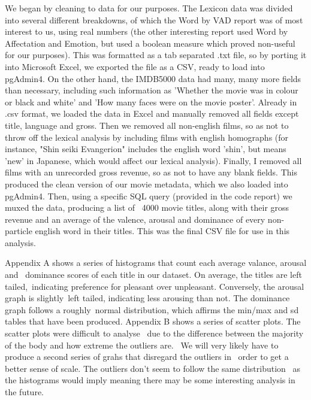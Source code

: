 \documentclass[10pt,a4paper]{article}
\begin{document}
    We began by cleaning to data for our purposes. The Lexicon data was divided into several different breakdowns, of which the Word by VAD report was of most interest to us, using real numbers (the other interesting report used Word by Affectation and Emotion, but used a boolean measure which proved non-useful for our purposes). This was formatted as a tab separated .txt file, so by porting it into Microsoft Excel, we exported the file as a CSV, ready to load into pgAdmin4.
    \newline \newline
    On the other hand, the IMDB5000 data had many, many more fields than necessary, including such information as 'Whether the movie was in colour or black and white' and 'How many faces were on the movie poster'. Already in .csv format, we loaded the data in Excel and manually removed all fields except title, language and gross. Then we removed all non-english films, so as not to throw off the lexical analysis by including films with english homographs (for instance, "Shin seiki Evangerion" includes the english word 'shin', but means 'new' in Japanese, which would affect our lexical analysis). Finally, I removed all films with an unrecorded gross revenue, so as not to have any blank fields. This produced the clean version of our movie metadata, which we also loaded into pgAdmin4.
    \newline \newline
    Then, using a specific SQL query (provided in the code report) we muxed the data, producing a list of ~4000 movie titles, along with their gross revenue and an average of the valence, arousal and dominance of every non-particle english word in their titles. This was the final CSV file for use in this analysis.
    \newline \newline

    Appendix A shows a series of histograms that count each average valance, arousal and \
    dominance scores of each title in our dataset. On average, the titles are left tailed,\
    indicating preference for pleasant over unpleasant. Conversely, the arousal graph is slightly\
    left tailed, indicating less arousing than not. The dominance graph follows a roughly\
    normal distribution, which affirms the min/max and sd tables that have been produced.
    \newline \newline
    Appendix B shows a series of scatter plots. The scatter plots were difficult to analyse \
    due to the difference between the majority of the body and how extreme the outliers are. \
    We will very likely have to produce a second series of grahs that disregard the outliers in \
    order to get a better sense of scale. The outliers don't seem to follow the same distribution \
    as the histograms would imply meaning there may be some interesting analysis in the future.
\end{document}
